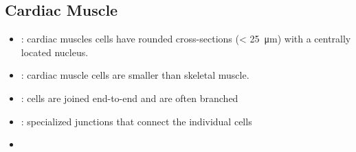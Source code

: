 \begin{itemize}
\begin{multicols}{2}
\begin{itemize}
   \begin{center}
  \end{center}
  \end{itemize}
  \end{multicols}

  \newpage 

  \subsection{Cardiac Muscle}
  \begin{multicols}{2}
  \begin{itemize}
    \item {}: cardiac muscles cells have rounded cross-sections (< \SI{25}{\micro\meter}) with a centrally located nucleus.

    \begin{center}
    \end{center}
    
    \item {}: cardiac muscle cells are smaller than skeletal muscle.
    
    \begin{center}
    \end{center}
    
    \vspace{30pt}

    \item {}: cells are joined end-to-end and are often branched
    
    \begin{center}
    \end{center}

    \item {}: specialized junctions that connect the individual cells 
    
    \begin{center}
    \end{center}

    \item {}
    
    \begin{center}
    \end{center}



\end{itemize}
\end{multicols}
\end{itemize}
